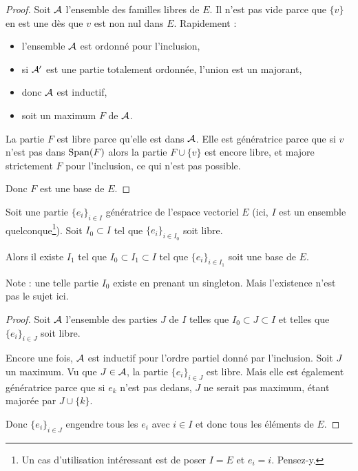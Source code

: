 \begin{proof}
    Soit \( \mathcal{A}\) l'ensemble des familles libres de \( E\). Il n'est pas vide parce que \( \{ v \}\) en est une dès que \( v\) est non nul dans \( E\). Rapidement :
    \begin{itemize}
        \item l'ensemble \( \mathcal{A}\) est ordonné pour l'inclusion,
        \item si \( \mathcal{A}'\) est une partie totalement ordonnée, l'union est un majorant,
        \item donc \( \mathcal{A}\) est inductif,
        \item soit un maximum \( F\) de \( \mathcal{A}\).
    \end{itemize}
    La partie \( F\) est libre parce qu'elle est dans \( \mathcal{A}\). Elle est génératrice parce que si \( v\) n'est pas dans \( \operatorname{Span}(F)\) alors la partie \( F\cup\{ v \}\) est encore libre, et majore strictement $F$ pour l'inclusion, ce qui n'est pas possible.

    Donc \( F\) est une base de \( E\).
\end{proof}

\begin{theorem}      \label{THOooOQLQooHqEeDK}
    Soit une partie \( \{ e_i \}_{i\in I}\) génératrice de l'espace vectoriel \( E\) (ici, \( I\) est un ensemble quelconque\footnote{Un cas d'utilisation intéressant est de poser \( I=E\) et \( e_i=i\). Pensez-y.}). Soit \( I_0\subset I\) tel que \( \{ e_i \}_{i\in I_0}\) soit libre.

    Alors il existe \( I_1\) tel que \( I_0\subset I_1\subset I\) tel que \( \{ e_i \}_{i\in I_1}\) soit une base de \( E\).
\end{theorem}

Note : une telle partie \( I_0\) existe en prenant un singleton. Mais l'existence n'est pas le sujet ici.

\begin{proof}
    Soit \( \mathcal{A}\) l'ensemble des parties \( J\) de \( I\) telles que \( I_0\subset J\subset I\) et telles que \( \{ e_i \}_{i\in J}\) soit libre.

    Encore une fois, \( \mathcal{A}\) est inductif pour l'ordre partiel donné par l'inclusion. Soit \( J\) un maximum. Vu que \( J\in\mathcal{A}\), la partie \( \{ e_i \}_{i\in J}\) est libre. Mais elle est également génératrice parce que si \( e_k\) n'est pas dedans, \( J\) ne serait pas maximum, étant majorée par \( J\cup\{ k \}\).

    Donc \( \{ e_i \}_{i\in J}\) engendre tous les \( e_i\) avec \( i\in I\) et donc tous les éléments de \( E\).
\end{proof}


